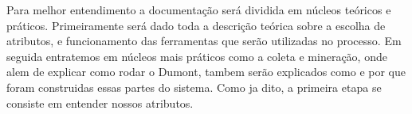 Para melhor entendimento a documentação será dividida em núcleos teóricos e práticos. Primeiramente será dado toda a descrição teórica sobre a escolha de atributos, e funcionamento das ferramentas que serão utilizadas no processo. Em seguida entratemos em núcleos mais práticos como a coleta e mineração, onde alem de explicar como rodar o Dumont, tambem serão explicados como e por que foram construidas essas partes do sistema. Como ja dito, a primeira etapa se consiste em entender nossos atributos.




